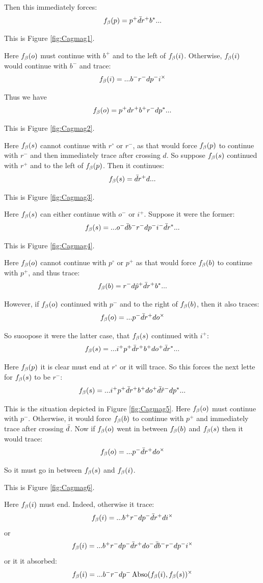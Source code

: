 Then this immediately forces:
\[
f_\beta(p) = p^+ \bar{d} r^+ b^*...
\]

This is Figure \ref{fig:Cagmag1}.

Here $f_\beta(o)$ must continue with $b^+$ and to the left of $f_\beta(i)$. Otherwise, $f_\beta(i)$ would continue with $b^-$ and trace:
\[
f_\beta(i) = ...b^- r^- d p^- i^\times
\]

Thus we have
\[
f_\beta(o) = p^+ d r^+ b^+ r^- d p^*...
\]

This is Figure \ref{fig:Cagmag2}.

Here $f_\beta(s)$ cannot continue with $r^\circ$ or $r^-$, as that would force $f_\beta(p)$ to continue with $r^-$ and then immediately trace after crossing $d$. So suppose $f_\beta(s)$ continued with $r^+$ and to the left of $f_\beta(p)$. Then it continues:
\[
f_\beta(s) = \bar{d} r^+ d...
\]

This is Figure \ref{fig:Cagmag3}. 

Here $f_\beta(s)$ can either continue with $o^-$ or $i^+$. Suppose it were the former:
\[
f_\beta(s) = ...o^- \bar{d} b^- r^- d p^- i^- \bar{d} r^*...
\]

This is Figure \ref{fig:Cagmag4}.

Here $f_\beta(o)$ cannot continue with $p^\circ$ or $p^+$ as that would force $f_\beta(b)$ to continue with $p^+$, and thus trace:
\[
f_\beta(b) = r^- d \hat{p}^+ \bar{d} r^+ b^*...
\]

However, if $f_\beta(o)$ continued with $p^-$ and to the right of $f_\beta(b)$, then it also traces:
\[
f_\beta(o) = ...p^- \bar{d} r^+ d o^\times
\]

So suoopose it were the latter case, that $f_\beta(s)$ continued with $i^+$:
\[
f_\beta(s) = ...i^+ p^+ \bar{d} r^+ b^+ d o^+ \bar{d} r^*...
\]

Here $f_\beta(p)$ it is clear must end at $r^\circ$ or it will trace. So this forces the next lette for $f_\beta(s)$ to be $r^-$:
\[
f_\beta(s) = ...i^+ p^+ \bar{d} r^+ b^+ d o^+ \bar{d} \hat{r}^- d p^*...
\]

This is the situation depicted in Figure \ref{fig:Cagmag5}.
Here $f_\beta(o)$ must continue with $p^-$. Otherwise, it would force $f_\beta(b)$ to continue with $p^+$ and immediately trace after crossing $\bar{d}$. Now if $f_\beta(o)$ went in between $f_\beta(b)$ and $f_\beta(s)$ then it would trace:
\[
f_\beta(o) = ...p^- \bar{d} r^+ d o^\times
\]

So it must go in between $f_\beta(s)$ and $f_\beta(i)$. 

This is Figure \ref{fig:Cagmag6}. 

Here $f_\beta(i)$ must end. Indeed, otherwise it trace:
\[
f_\beta(i) = ...b^+ r^- d p^- \bar{d} r^+ d i^\times
\]
or
\[
f_\beta(i) = ...b^+ r^- d p^- \bar{d} r^+ d o^- \bar{d} b^- r^- d p^- i^\times
\]
or it it absorbed:
\[
f_\beta(i) = ...b^- r^- d p^- \operatorname{Abso}(f_\beta(i), f_\beta(s))^\times
\]


